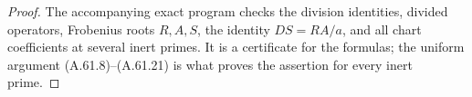 \begin{proof}
The accompanying exact program checks the
division identities, divided operators,
Frobenius roots \(R,A,S\), the identity
\(DS=RA/a\), and all chart coefficients at
several inert primes. It is a certificate
for the formulas; the uniform argument
(A.61.8)--(A.61.21) is what proves the
assertion for every inert prime.
\end{proof}
